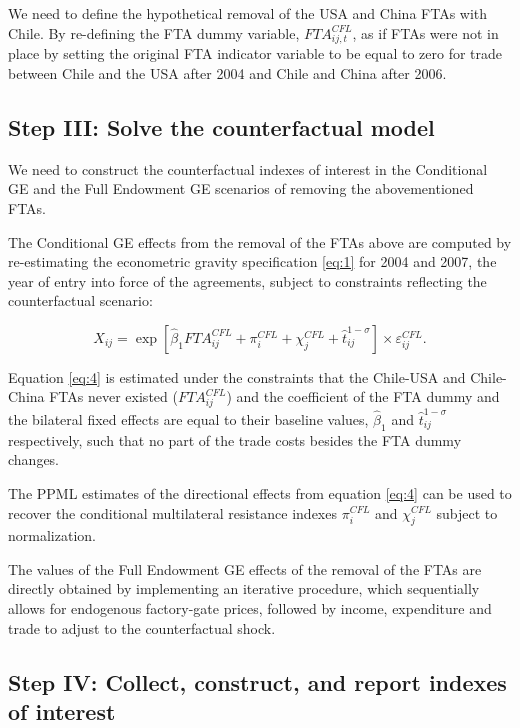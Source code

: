 \documentclass[10pt]{article}
\begin{document}
We need to define the hypothetical removal of the USA and China FTAs
with Chile. By re-defining the FTA dummy variable, \(FTA^{CFL}_{ij,t}\),
as if FTAs were not in place by setting the original FTA indicator
variable to be equal to zero for trade between Chile and the USA after
2004 and Chile and China after 2006.

\hypertarget{step-iii-solve-the-counterfactual-model}{%
\subsection{Step III: Solve the counterfactual
model}\label{step-iii-solve-the-counterfactual-model}}

We need to construct the counterfactual indexes of interest in the
Conditional GE and the Full Endowment GE scenarios of removing the
abovementioned FTAs.

The Conditional GE effects from the removal of the FTAs above are
computed by re-estimating the econometric gravity specification
\eqref{eq:1} for 2004 and 2007, the year of entry into force of the
agreements, subject to constraints reflecting the counterfactual
scenario:

\begin{equation}
X_{ij} = \exp\left[\hat{\beta}_1 FTA^{CFL}_{ij} + \pi^{CFL}_{i} + \chi^{CFL}_{j} + \hat{t}^{1-\sigma}_{ij}\right]\times \varepsilon^{CFL}_{ij}. \label{eq:4}
\end{equation}

Equation \eqref{eq:4} is estimated under the constraints that the
Chile-USA and Chile-China FTAs never existed (\(FTA^{CFL}_{ij}\)) and
the coefficient of the FTA dummy and the bilateral fixed effects are
equal to their baseline values, \(\hat{\beta}_1\) and
\(\hat{t}^{1-\sigma}_{ij}\) respectively, such that no part of the trade
costs besides the FTA dummy changes.

The PPML estimates of the directional effects from equation \eqref{eq:4}
can be used to recover the conditional multilateral resistance indexes
\(\pi^{CFL}_{i}\) and \(\chi^{CFL}_{j}\) subject to normalization.

The values of the Full Endowment GE effects of the removal of the FTAs
are directly obtained by implementing an iterative procedure, which
sequentially allows for endogenous factory-gate prices, followed by
income, expenditure and trade to adjust to the counterfactual shock.

\hypertarget{step-iv-collect-construct-and-report-indexes-of-interest}{%
\subsection{Step IV: Collect, construct, and report indexes of
interest}\label{step-iv-collect-construct-and-report-indexes-of-interest}}
\end{document}
